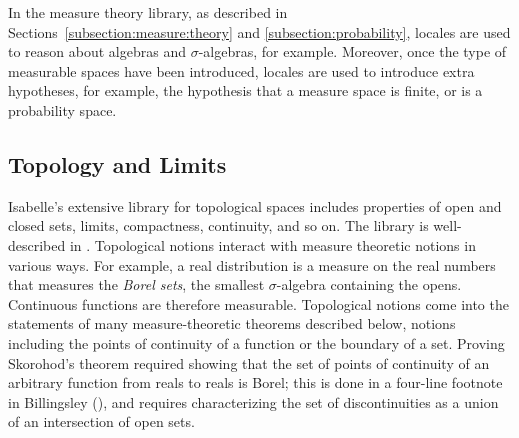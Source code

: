 \documentclass{svjour3}
\begin{document}
In the measure theory library, as described in Sections~\ref{subsection:measure:theory} and \ref{subsection:probability}, locales are used to reason about algebras and $\sigma$-algebras, for example. Moreover, once the type of measurable spaces have been introduced, locales are used to introduce extra hypotheses, for example, the hypothesis that a measure space is finite, or is a probability space. 

\subsection{Topology and Limits}
\label{subsection:topology}

Isabelle's extensive library for topological spaces includes properties of open and closed sets, limits, compactness, continuity, and so on. The library is well-described in \cite{hoelzl:et:al:13}. Topological notions interact with measure theoretic notions in various ways. For example, a real distribution is a measure on the real numbers that measures the \emph{Borel sets}, the smallest $\sigma$-algebra containing the opens. Continuous functions are therefore measurable. Topological notions come into the statements of many measure-theoretic theorems described below, notions including the points of continuity of a function or the boundary of a set. Proving Skorohod's theorem required showing that the set of points of continuity of an arbitrary function from reals to reals is Borel; this is done in a four-line footnote in Billingsley (\cite[page 334]{billingsley:95}), and requires characterizing the set of discontinuities as a union of an intersection of open sets.
\end{document}
